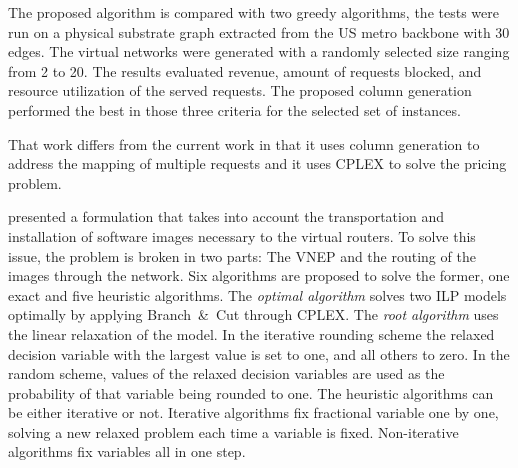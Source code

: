 The proposed algorithm is compared with two greedy algorithms, the tests were run on a physical substrate graph extracted from the US metro backbone with 30 edges. The virtual networks were generated with a randomly selected size ranging from 2 to 20. The results evaluated revenue, amount of requests blocked, and resource utilization of the served requests. The proposed column generation performed the best in those three criteria for the selected set of instances.

That work differs from the current work in that it uses column generation to address the mapping of multiple requests and it uses CPLEX to solve the pricing problem.


\citet{Alkmim2013} presented a formulation that takes into account the transportation and installation of software images necessary to the virtual routers. To solve this issue, the problem is broken in two parts: The VNEP and the routing of the images through the network. Six algorithms are proposed to solve the former, one exact and five heuristic algorithms. The \emph{optimal algorithm} solves two ILP models optimally by applying Branch~\&~Cut through CPLEX.
The \emph{root algorithm} uses the linear relaxation of the model. In the iterative rounding scheme the relaxed decision variable with the largest value is set to one, and all others to zero. In the random scheme, values of the relaxed decision variables are used as the probability of that variable being rounded to one. The heuristic algorithms can be either iterative or not. Iterative algorithms fix fractional variable one by one, solving a new relaxed problem each time a variable is fixed. Non-iterative algorithms fix variables all in one step.




